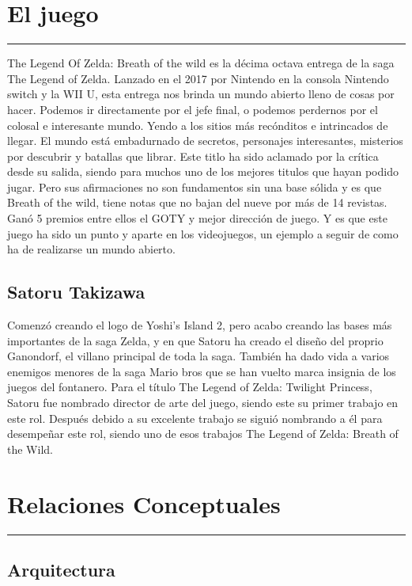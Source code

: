 \documentclass[12pt]{article}
\begin{document}
\section{El juego}
    \hrule
\vspace{1cm}
The Legend Of Zelda: Breath of the wild es la décima octava entrega de la saga The Legend of Zelda. Lanzado en el 2017 por Nintendo en la consola Nintendo switch y la WII U, esta entrega nos brinda un mundo abierto lleno de cosas por hacer. Podemos ir directamente por el jefe final, o podemos perdernos por el colosal e interesante mundo. Yendo a los sitios más recónditos e intrincados de llegar.
    El mundo está embadurnado de secretos, personajes interesantes, misterios por descubrir y batallas que librar. Este titlo ha sido aclamado por la crítica desde su salida, siendo para muchos uno de los mejores titulos que hayan podido jugar. Pero sus afirmaciones no son fundamentos sin una base sólida y es que Breath of the wild, tiene notas que no bajan del nueve por más de 14 revistas. Ganó 5 premios entre ellos el GOTY y mejor dirección de juego. Y es que este juego ha sido un punto y aparte en los videojuegos, un ejemplo a seguir de como ha de realizarse un mundo abierto.

\subsection{Satoru Takizawa}
Comenzó creando el logo de Yoshi's Island 2, pero acabo creando las bases más importantes de la saga Zelda, y en que Satoru ha creado el diseño del proprio Ganondorf, el villano principal de toda la saga. También ha dado vida a varios enemigos menores de la saga Mario bros que se han vuelto marca insignia de los juegos del fontanero. Para el título The Legend of Zelda: Twilight Princess, Satoru fue nombrado director de arte del juego, siendo este su primer trabajo en este rol. Después debido a su excelente trabajo se siguió nombrando a él para desempeñar este rol, siendo uno de esos trabajos The Legend of Zelda: Breath of the Wild.
\section{Relaciones Conceptuales}
    \hrule
\vspace{1cm}

\subsection{Arquitectura}
\end{document}
